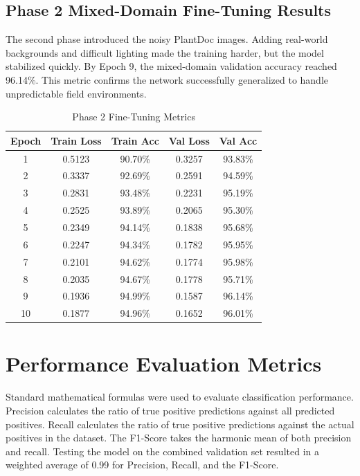 \documentclass[12pt, a4paper]{report}
\begin{document}
\subsection{Phase 2 Mixed-Domain Fine-Tuning Results}
The second phase introduced the noisy PlantDoc images. Adding real-world backgrounds and difficult lighting made the training harder, but the model stabilized quickly. By Epoch 9, the mixed-domain validation accuracy reached 96.14\%. This metric confirms the network successfully generalized to handle unpredictable field environments.

\begin{table}[h!]
\centering
\caption{Phase 2 Fine-Tuning Metrics}
\vspace{0.3cm}
\begin{tabular}{@{}ccccc@{}}
\toprule
\textbf{Epoch} & \textbf{Train Loss} & \textbf{Train Acc} & \textbf{Val Loss} & \textbf{Val Acc} \\
\midrule
1 & 0.5123 & 90.70\% & 0.3257 & 93.83\% \\
2 & 0.3337 & 92.69\% & 0.2591 & 94.59\% \\
3 & 0.2831 & 93.48\% & 0.2231 & 95.19\% \\
4 & 0.2525 & 93.89\% & 0.2065 & 95.30\% \\
5 & 0.2349 & 94.14\% & 0.1838 & 95.68\% \\
6 & 0.2247 & 94.34\% & 0.1782 & 95.95\% \\
7 & 0.2101 & 94.62\% & 0.1774 & 95.98\% \\
8 & 0.2035 & 94.67\% & 0.1778 & 95.71\% \\
9 & 0.1936 & 94.99\% & 0.1587 & 96.14\% \\
10 & 0.1877 & 94.96\% & 0.1652 & 96.01\% \\
\bottomrule
\end{tabular}
\end{table}

\section{Performance Evaluation Metrics}
Standard mathematical formulas were used to evaluate classification performance. Precision calculates the ratio of true positive predictions against all predicted positives. Recall calculates the ratio of true positive predictions against the actual positives in the dataset. The F1-Score takes the harmonic mean of both precision and recall. Testing the model on the combined validation set resulted in a weighted average of 0.99 for Precision, Recall, and the F1-Score. 
\end{document}
